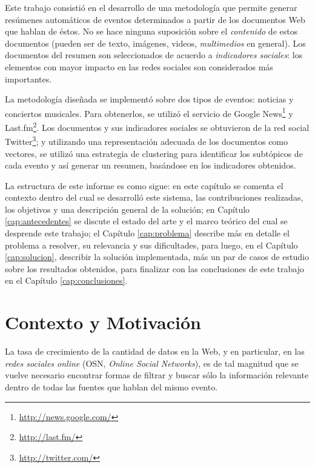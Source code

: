 \documentclass[upright, contnum]{umemoria}
\begin{document}
  Este trabajo consistió en el desarrollo de una metodología
  que permite generar resúmenes automáticos de eventos determinados
  a partir de los documentos Web que hablan de éstos. No se hace
  ninguna suposición sobre el \emph{contenido} de estos documentos (pueden
  ser de texto, imágenes, videos, \emph{multimedios} en general). Los
  documentos del resumen son seleccionados de acuerdo a 
  \emph{indicadores sociales}: los elementos con mayor impacto en las redes
  sociales son considerados más importantes.
  
  La metodología diseñada se implementó sobre dos tipos de eventos:
  noticias y conciertos musicales. Para obtenerlos, se utilizó
  el servicio de Google News\footnote{\href{http://news.google.com/}{http://news.google.com/} } y
  Last.fm\footnote{\href{http://last.fm/}{http://last.fm/} }. Los documentos y sus indicadores
  sociales se obtuvieron de la red social
  Twitter\footnote{\href{http://twitter.com/}{http://twitter.com/} }; y utilizando una representación
  adecuada de los documentos como vectores, se utilizó una estrategia
  de clustering para identificar los subtópicos de cada evento y así
  generar un resumen, basándose en los indicadores obtenidos.

  La estructura de este informe es como sigue: en este capítulo se
  comenta el contexto dentro del cual se desarrolló este sistema, las
  contribuciones realizadas, los objetivos y una descripción general
  de la solución; en Capítulo \ref{cap:antecedentes} se discute el estado del
  arte y el marco teórico del cual se desprende este trabajo; el
  Capítulo \ref{cap:problema} describe más en detalle el problema a resolver, su
  relevancia y sus dificultades, para luego, en el
  Capítulo \ref{cap:solucion}, describir la solución implementada, más
  un par de casos de estudio sobre los resultados obtenidos, para
  finalizar con las conclusiones de este trabajo en el Capítulo
  \ref{cap:conclusiones}.

\section{Contexto y Motivación}
\label{sec-1.1}

   
   La tasa de crecimiento de la cantidad de datos en la Web, y en
   particular, en las \emph{redes sociales online} (OSN, \emph{Online Social Networks}),
   es de tal magnitud que se vuelve necesario encontrar formas de
   filtrar y buscar sólo la información relevante dentro de todas las
   fuentes que hablan del mismo evento. 
\end{document}
